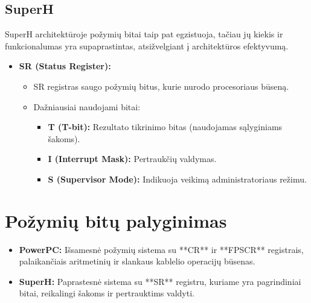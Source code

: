 \documentclass{article}
\begin{document}
\subsection{SuperH}
SuperH architektūroje požymių bitai taip pat egzistuoja, tačiau jų kiekis ir funkcionalumas yra supaprastintas, atsižvelgiant į architektūros efektyvumą.

\begin{itemize}
    \item \textbf{SR (Status Register):}
        \begin{itemize}
            \item SR registras saugo požymių bitus, kurie nurodo procesoriaus būseną.
            \item Dažniausiai naudojami bitai:
                \begin{itemize}
                    \item \textbf{T (T-bit):} Rezultato tikrinimo bitas (naudojamas sąlyginiams šakoms).
                    \item \textbf{I (Interrupt Mask):} Pertraukčių valdymas.
                    \item \textbf{S (Supervisor Mode):} Indikuoja veikimą administratoriaus režimu.
                \end{itemize}
        \end{itemize}
\end{itemize}

\section*{Požymių bitų palyginimas}
\begin{itemize}
    \item \textbf{PowerPC:} Išsamesnė požymių sistema su **CR** ir **FPSCR** registrais, palaikančiais aritmetinių ir slankaus kablelio operacijų būsenas.
    \item \textbf{SuperH:} Paprastesnė sistema su **SR** registru, kuriame yra pagrindiniai bitai, reikalingi šakoms ir pertrauktims valdyti.
\end{itemize}



 
\end{document}

